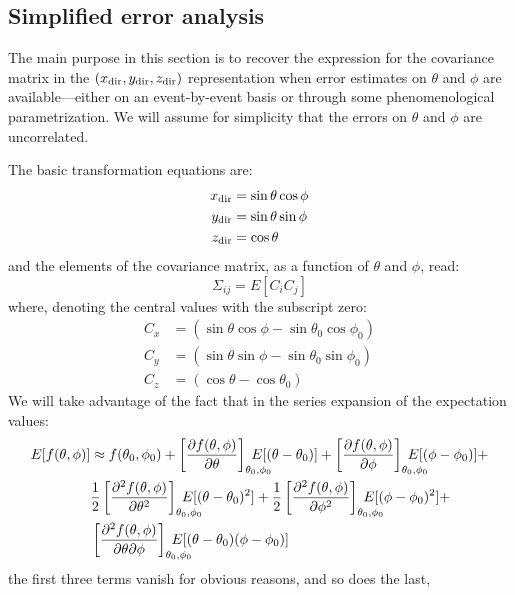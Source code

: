 \documentclass[a4paper,11pt]{article}
\newcommand{\pder}[2]{\frac{\partial#1}{\partial#2}}
\newcommand{\pdersec}[3]%
           {\ifthenelse{\equal{#2}{#3}}%
             {\frac{\partial^2#1}{\partial#2^2}}%
             {\frac{\partial^2#1}{\partial#2\partial#3}}%
           }
\newcommand{\xdir}{\ensuremath{x_{\rm dir}}}
\newcommand{\ydir}{\ensuremath{y_{\rm dir}}}
\newcommand{\zdir}{\ensuremath{z_{\rm dir}}}
\begin{document}
\subsection{Simplified error analysis}

The main purpose in this section is to recover the expression for the
covariance matrix in the $(\xdir, \ydir, \zdir)$ representation when error
estimates on $\theta$ and $\phi$ are available---either on an event-by-event
basis or through some phenomenological parametrization. We will assume for
simplicity that the errors on $\theta$ and $\phi$ are uncorrelated.

The basic transformation equations are:
\begin{align}
  \xdir & = \sin\theta \cos\phi\\
  \ydir & = \sin\theta \sin\phi\\
  \zdir & = \cos\theta
\end{align}
and the elements of the covariance matrix, as a function of $\theta$
and $\phi$, read:
\begin{equation}
  \Sigma_{ij} = E[C_i C_j]
\end{equation}
where, denoting the central values with the subscript zero:
\begin{align}
  C_x & = (\sin\theta \cos\phi - \sin\theta_0 \cos\phi_0)\\
  C_y & = (\sin\theta \sin\phi - \sin\theta_0 \sin\phi_0)\\
  C_z & = (\cos\theta - \cos\theta_0)
\end{align}
We will take advantage of the fact that in the series expansion of the 
expectation values:
\begin{align}
  E[f(\theta, \phi)] & \approx f(\theta_0, \phi_0) + 
  \left[\pder{f(\theta, \phi)}{\theta}\right]_{\theta_0, \phi_0}
  \!\!\!\!\!\!\!\!\!\!E[(\theta - \theta_0)] +
  \left[\pder{f(\theta, \phi)}{\phi}\right]_{\theta_0, \phi_0}
  \!\!\!\!\!\!\!\!\!\!E[(\phi - \phi_0)] +\\\nonumber
  & \frac{1}{2}\left[\pdersec{f(\theta, \phi)}{\theta}{\theta}
  \right]_{\theta_0, \phi_0}
  \!\!\!\!\!\!\!\!\!\!E[(\theta - \theta_0)^2] +
  \frac{1}{2}\left[\pdersec{f(\theta, \phi)}{\phi}{\phi}
  \right]_{\theta_0, \phi_0}
  \!\!\!\!\!\!\!\!\!\!E[(\phi - \phi_0)^2] +\\\nonumber
  & \left[\pdersec{f(\theta, \phi)}{\theta}{\phi}\right]_{\theta_0, \phi_0}
  \!\!\!\!\!\!\!\!\!\!E[(\theta - \theta_0)(\phi - \phi_0)]
\end{align}
the first three terms vanish for obvious reasons, and so does the last,
\end{document}
